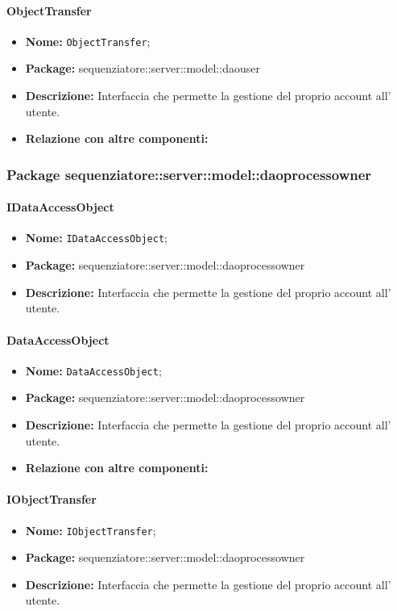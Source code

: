\paragraph{ObjectTransfer}
	\begin{itemize}
		\item \textbf{Nome:} \texttt{ObjectTransfer};
		\item \textbf{Package:} sequenziatore::server::model::daouser
		\item \textbf{Descrizione:} Interfaccia che permette la gestione del proprio account all' utente.
		\item \textbf{Relazione con altre componenti:}
	\end{itemize}
\subsubsection{Package sequenziatore::server::model::daoprocessowner}
\paragraph{IDataAccessObject}
	\begin{itemize}
		\item \textbf{Nome:} \texttt{IDataAccessObject};
		\item \textbf{Package:} sequenziatore::server::model::daoprocessowner
		\item \textbf{Descrizione:} Interfaccia che permette la gestione del proprio account all' utente.
	\end{itemize}
\paragraph{DataAccessObject}
	\begin{itemize}
		\item \textbf{Nome:} \texttt{DataAccessObject};
		\item \textbf{Package:} sequenziatore::server::model::daoprocessowner
		\item \textbf{Descrizione:} Interfaccia che permette la gestione del proprio account all' utente.
		\item \textbf{Relazione con altre componenti:}
	\end{itemize}
\paragraph{IObjectTransfer}
	\begin{itemize}
		\item \textbf{Nome:} \texttt{IObjectTransfer};
		\item \textbf{Package:} sequenziatore::server::model::daoprocessowner
		\item \textbf{Descrizione:} Interfaccia che permette la gestione del proprio account all' utente.
	\end{itemize}
